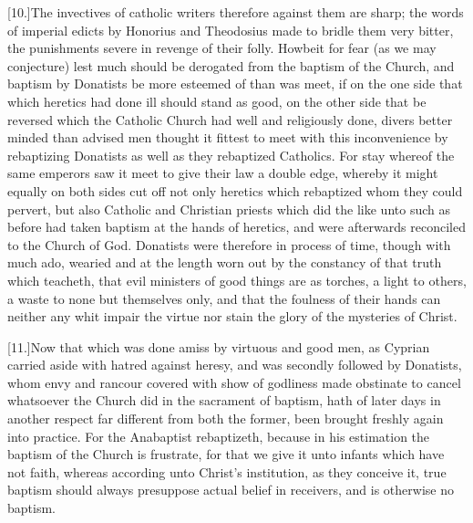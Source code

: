 [10.]The invectives of catholic writers therefore against them are sharp; the words of imperial edicts by Honorius and Theodosius made to bridle them very bitter, the punishments  severe in revenge of their folly.
 Howbeit for fear (as we may conjecture) lest much should be derogated from the baptism of the Church, and baptism by Donatists be more esteemed of than was meet, if on the one side that which heretics had done ill should stand as good, on the other side that be reversed which the Catholic Church had well and religiously done, divers better minded than advised men thought it fittest to meet with this inconvenience by rebaptizing Donatists as well as they rebaptized Catholics. For stay whereof the same emperors saw it meet to give their law a double edge, whereby it might equally on both sides cut off not only heretics which rebaptized whom they could pervert, but also Catholic and Christian priests which did the like unto such as before had taken baptism at the hands of heretics, and were afterwards reconciled to the Church of God. Donatists were therefore in process of time, though with much ado, wearied and at the length worn out by the constancy of that truth which teacheth, that evil ministers of good things are as torches, a light to others, a waste to none but themselves only, and that the foulness of their hands can neither any whit impair the virtue nor stain the glory of the mysteries of Christ.

[11.]Now that which was done amiss by virtuous and good men, as Cyprian carried aside with hatred against heresy, and was secondly followed by Donatists, whom envy and rancour covered with show of godliness made obstinate to cancel whatsoever the Church did in the sacrament of baptism, hath of later days in another respect far different from both the former, been brought freshly again into practice. For the Anabaptist rebaptizeth, because in his estimation the baptism of the Church is frustrate, for that we give it unto infants which have not faith, whereas according unto Christ’s institution, as they conceive it, true baptism should always presuppose actual belief in receivers, and is otherwise no baptism.

